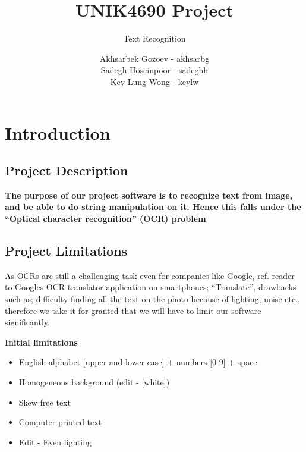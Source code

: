 \documentclass[11pt,a4paper,UKenglish]{report}
\title{UNIK4690 Project}
\subtitle{Text Recognition}
\author{
  Akhsarbek Gozoev  - akhsarbg \\
  Sadegh Hoseinpoor - sadeghh\\
  Key Lung Wong - keylw
}
\begin{document}
\ififorside[kind={Report}]

\newpage
\tableofcontents
\newpage

\chapter{Introduction}
\label{sec:Introduction}
\section{Project Description}
\textbf{The purpose of our project software is to recognize text from image,
and be able to do string manipulation on it. Hence this falls under the
``Optical character recognition'' (OCR) problem}

\section{Project Limitations}
As OCRs are still a challenging task even for companies like
Google, ref. reader to Googles OCR translator application on smartphones;
``Translate'', drawbacks such as; difficulty finding all the text on the photo
because of lighting, noise etc., therefore we take it for granted that we will
have to limit our software significantly.

\begin{flushleft}
  \textbf{Initial limitations}
  \begin{itemize}
    \item{English alphabet [upper and lower case] + numbers [0-9] + space}
    \item{Homogeneous background (edit - [white])}
    \item{Skew free text}
    \item{Computer printed text}
    \item{Edit - Even lighting}
  \end{itemize}
\end{flushleft}
\end{document}
